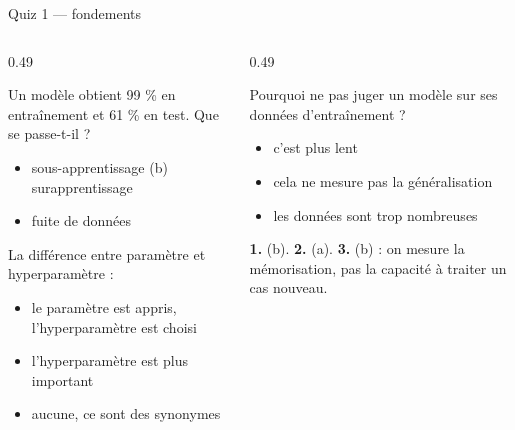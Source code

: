 \begin{frame}{Quiz 1 --- fondements}
\begin{columns}[t]
\begin{column}{0.49\textwidth}
\begin{qbox}[Question 1]
Un modèle obtient 99 \% en entraînement et 61 \% en test. Que se passe-t-il ?
\begin{itemize}
  \item[(a)] sous-apprentissage \quad (b) surapprentissage
  \item[(c)] fuite de données
\end{itemize}
\end{qbox}
\begin{qbox}[Question 2]
La différence entre paramètre et hyperparamètre :
\begin{itemize}
  \item[(a)] le paramètre est appris, l'hyperparamètre est choisi
  \item[(b)] l'hyperparamètre est plus important
  \item[(c)] aucune, ce sont des synonymes
\end{itemize}
\end{qbox}
\end{column}
\begin{column}{0.49\textwidth}
\begin{qbox}[Question 3]
Pourquoi ne pas juger un modèle sur ses données d'entraînement ?
\begin{itemize}
  \item[(a)] c'est plus lent
  \item[(b)] cela ne mesure pas la généralisation
  \item[(c)] les données sont trop nombreuses
\end{itemize}
\end{qbox}
\begin{solbox}[Réponses]
\textbf{1.} (b). \quad \textbf{2.} (a). \quad \textbf{3.} (b) : on mesure la
mémorisation, pas la capacité à traiter un cas nouveau.
\end{solbox}
\end{column}
\end{columns}
\end{frame}
